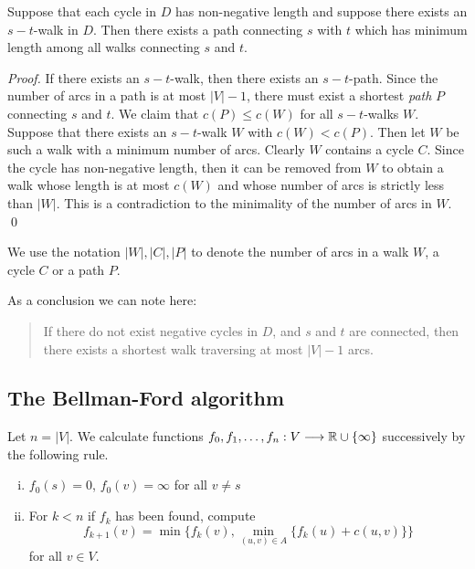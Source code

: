 \begin{theorem}
  \label{f:thr:1}
  Suppose that each cycle in $D$ has non-negative length and suppose
  there exists an $s-t$-walk in $D$. Then there exists a path
  connecting $s$ with $t$ which has minimum length among all walks
  connecting $s$ and $t$. 
\end{theorem}

\begin{proof}
  If there exists an $s-t$-walk, then there exists an $s-t$-path. Since
  the number of arcs in a path is at most $|V| - 1 $, there must exist a
  shortest \emph{path}  $P$  connecting $s$ and $t$. We claim that
  $c(P)\leq c(W)$ for all $s-t$-walks $W$. Suppose that there exists
  an $s-t$-walk $W$ with $c(W)<c(P)$. Then let $W$ be such a walk with
  a minimum number of arcs. Clearly $W$ contains a cycle $C$.  Since the
  cycle has non-negative length, then it can be removed from $W$ to
  obtain a walk whose length is at most $c(W)$ and whose number of
  arcs is strictly less than $|W|$. This is a contradiction to the 
  minimality of the number of arcs in $W$.
  \qed
\end{proof}

We use the notation $|W|,|C|,|P|$ to denote the number of arcs in a
walk $W$, a cycle $C$ or a path $P$. 


As a conclusion we can note here: 
\begin{quote}
  If there do not exist negative cycles in $D$, and $s$ and $t$ are
  connected, then there exists a shortest walk traversing at most 
  $|V|  - 1$ arcs.
\end{quote}


\subsection*{The Bellman-Ford algorithm}

Let $n=|V|$. We calculate functions $f_0,f_1,\ldots,f_n:V\longrightarrow\mathbb{R}\cup\{\infty\}$
successively by the following rule. 

\begin{enumerate}[i)]
\item $f_0(s) = 0$, $f_0(v) = \infty$ for all $v \neq s$ 
\item For $k<n$ if $f_k$ has been found, compute 
  \begin{displaymath}
    \displaystyle f_{k+1}(v) = \min\{f_k(v), \min_{(u,v)\in A}\{f_k(u)+c(u,v)\} \}  
  \end{displaymath}
  for all $v \in V$. 
\end{enumerate}





